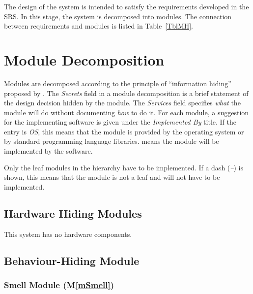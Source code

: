 \documentclass[12pt, titlepage]{article}
\newcommand{\mref}[1]{M\ref{#1}}
\begin{document}
The design of the system is intended to satisfy the requirements developed in
the SRS. In this stage, the system is decomposed into modules. The connection
between requirements and modules is listed in Table~\ref{TblMH}.


\section{Module Decomposition} \label{SecMD}

Modules are decomposed according to the principle of ``information hiding''
proposed by \citet{ParnasEtAl1984}. The \emph{Secrets} field in a module
decomposition is a brief statement of the design decision hidden by the
module. The \emph{Services} field specifies \emph{what} the module will do
without documenting \emph{how} to do it. For each module, a suggestion for the
implementing software is given under the \emph{Implemented By} title. If the
entry is \emph{OS}, this means that the module is provided by the operating
system or by standard programming language libraries.  \emph{\progname{}} means the
module will be implemented by the \progname{} software.

Only the leaf modules in the hierarchy have to be implemented. If a dash
(\emph{--}) is shown, this means that the module is not a leaf and will not have
to be implemented.

\subsection{Hardware Hiding Modules}

This system has no hardware components.

\subsection{Behaviour-Hiding Module}

\subsubsection{Smell Module (\mref{mSmell})}
\end{document}
